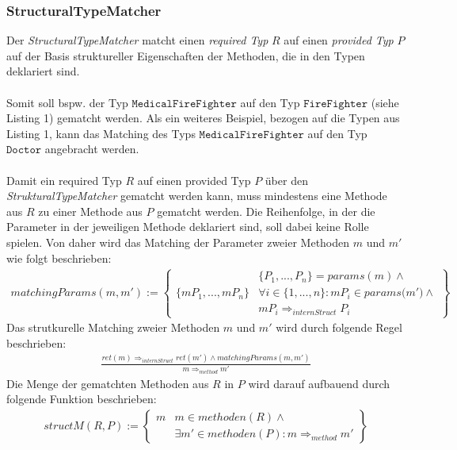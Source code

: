 \subsubsection{StructuralTypeMatcher} 
Der \emph{StructuralTypeMatcher} matcht einen \emph{required Typ} $R$ auf einen \emph{provided Typ} $P$ auf der Basis struktureller Eigenschaften der Methoden, die in den Typen deklariert sind. 
\\\\
Somit soll bspw. der Typ $\texttt{MedicalFireFighter}$ auf den Typ $\texttt{FireFighter}$ (siehe Listing 1) gematcht werden. Als ein weiteres Beispiel, bezogen auf die Typen aus Listing 1, kann das Matching des Typs $\texttt{MedicalFireFighter}$ auf den Typ $\texttt{Doctor}$ angebracht werden.
\\\\
Damit ein required Typ $R$ auf einen provided Typ $P$ über den \emph{StrukturalTypeMatcher} gematcht werden kann, muss mindestens eine Methode aus $R$ zu einer Methode aus $P$ gematcht werden. Die Reihenfolge, in der die Parameter in der jeweiligen Methode deklariert sind, soll dabei keine Rolle spielen. Von daher wird das Matching der Parameter zweier Methoden $m$ und $m'$ wie folgt beschrieben:
\begin{gather*}
\mathit{matchingParams(m, m')} :=
\left\{
\begin{array}{l|l}
	&
	\{\mathit{P_1,...,P_n}\} = \mathit{params(m)} \wedge \mathit{ }
	\\
	\{\mathit{mP_1,...,mP_n}\}
	&
	\forall i \in \{1,...,n\}: \mathit{mP_i} \in \mathit{params(m'}) \wedge \mathit{ }
	\\
	&
	\mathit{mP_i} \Rightarrow_{internStruct} \mathit{P_i}
\end{array}
\right\}
\end{gather*}
\noindent
Das strutkurelle Matching zweier Methoden $m$ und $m'$ wird durch folgende Regel beschrieben:
\begin{gather*}
\frac{\mathit{ret(m)} \Rightarrow_{internStruct} \mathit{ret(m')} \wedge \mathit{matchingParams(m,m')}}{m \Rightarrow_{method} m'}
\end{gather*}
\noindent
Die Menge der gematchten Methoden aus $R$ in $P$ wird darauf aufbauend durch folgende Funktion beschrieben:
\begin{gather*}
structM(R,P) := \left\{ 
				\begin{array}{l|l}
m	& \mathit{m} \in \mathit{methoden(R)} \wedge \mathit{ }
\\
	& \exists \mathit{m'} \in \mathit{methoden(P)} : m \Rightarrow_{method} m'
				\end{array}
              \right\}
\end{gather*}
\noindent

